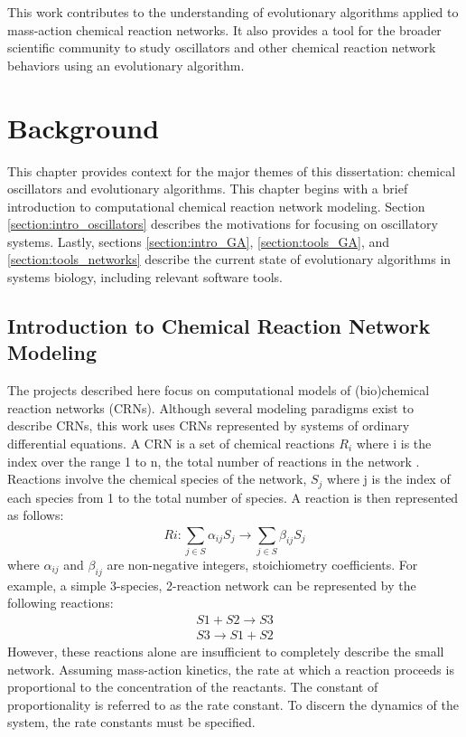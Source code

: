 \documentclass[12pt]{report}
\begin{document}
This work contributes to the understanding of evolutionary algorithms applied to mass-action chemical reaction networks. It also provides a tool for the broader scientific community to study oscillators and other chemical reaction network behaviors using an evolutionary algorithm.

\chapter{Background}

This chapter provides context for the major themes of this dissertation: chemical oscillators and evolutionary algorithms. This chapter begins with a brief introduction to computational chemical reaction network modeling. Section \ref{section:intro_oscillators} describes the motivations for focusing on oscillatory systems. Lastly, sections \ref{section:intro_GA}, \ref{section:tools_GA}, and \ref{section:tools_networks} describe the current state of evolutionary algorithms in systems biology, including relevant software tools.


\section[align=nothyphenated]{Introduction to Chemical Reaction Network Modeling}
\label{section:intro_crn}
The projects described here focus on computational models of (bio)chemical reaction networks (CRNs). Although several modeling paradigms exist to describe CRNs, this work uses CRNs represented by systems of ordinary differential equations. A CRN is a set of chemical reactions $R_i$ where i is the index over the range 1 to n, the total number of reactions in the network . Reactions involve the chemical species of the network, $S_j$ where j is the index of each species from 1 to the total number of species. A reaction is then represented as follows:
\begin{equation*}
Ri: \sum_{j\in S}^{}\alpha_{ij}S_j\to \sum_{j\in S}^{}\beta_{ij}S_j
\end{equation*}
where $\alpha_{ij}$ and $\beta_{ij}$ are non-negative integers, stoichiometry coefficients. For example, a simple 3-species, 2-reaction network can be represented by the following reactions:
\begin{equation}
\begin{split}
S1 + S2 \to S3 \\
S3 \to S1 + S2
\end{split}
\end{equation}
However, these reactions alone are insufficient to completely describe the small network.  Assuming mass-action kinetics, the rate at which a reaction proceeds is proportional to the concentration of the reactants. The constant of proportionality is referred to as the rate constant. To discern the dynamics of the system, the rate constants must be specified.
\end{document}
